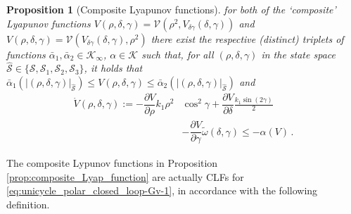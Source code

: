 \documentclass[letterpaper, 10 pt, conference]{ieeeconf}  %
\newtheorem{proposition}{Proposition}
\begin{document}
\begin{proposition}[{Composite Lyapunov functions}]
for both of the `composite' Lyapunov functions $V(\rho,\delta,\gamma) = \mathcal{V}\left(\rho^2,V_{\delta\gamma}(\delta,\gamma)\right)$ and $V(\rho,\delta,\gamma) = \mathcal{V}\left(V_{\delta\gamma}(\delta,\gamma), \rho^2 \right)$ there exist the respective (distinct) 
triplets of functions $\bar\alpha_1,\bar\alpha_2\in\mathcal{K}_\infty$, $\alpha\in\mathcal{K}$
such that,  for all $(\rho,\delta,\gamma)$ in the state space $\hat{\mathcal{S}}\in\{\mathcal{S},\mathcal{S}_1,\mathcal{S}_2,\mathcal{S}_3\}$, it holds that  
$ \bar\alpha_1(|(\rho,\delta, \gamma)|_{\hat{\mathcal{S}}}) \le V(\rho,\delta,\gamma) \le \bar\alpha_2(|(\rho,\delta, \gamma)|_{\hat{\mathcal{S}}})$ and 
\begin{align}
\dot{V}(\rho,\delta,\gamma) := 
-\dfrac{\partial V }{\partial \rho}%
k_1\rho^2&\cos^2\gamma  + %
\dfrac{\partial V}{\partial \delta}
\frac{k_1 \sin(2\gamma)}{2} 
 \nonumber\\
&-\dfrac{\partial V}{\partial\gamma}\tilde\omega(\delta,\gamma) \leq -\alpha(V)\,. \label{eq:V_dot_rho_delta_gamma}
\end{align}

\end{proposition}
The composite Lypunov functions in Proposition \ref{prop:composite_Lyap_function} are actually CLFs for \eqref{eq:unicycle_polar_closed_loop-Gv-1}, in accordance with the following definition. 
\end{document}
